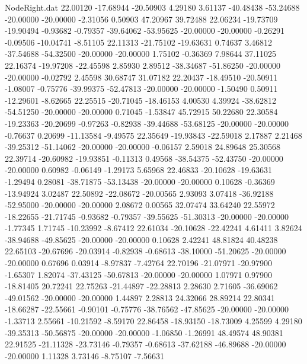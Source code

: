 \begin{filecontents}{NodeRight.dat}
  22.00120  -17.68944  -20.50903     4.29180    3.61137  -40.48438  -53.24688  -20.00000  -20.00000   -2.31056    0.50903   47.20967   39.72488
  22.06234  -19.73709  -19.90494    -0.93682   -0.79357  -39.64062  -53.95625  -20.00000  -20.00000   -0.26291   -0.09506  -10.04741   -8.51105
  22.11313  -21.75102  -19.63631     0.74637    3.46812  -37.54688  -54.32500  -20.00000  -20.00000    1.75102   -0.36369    7.98644   37.11025
  22.16374  -19.97208  -22.45598     2.85930    2.89512  -38.34687  -51.86250  -20.00000  -20.00000   -0.02792    2.45598   30.68747   31.07182
  22.20437  -18.49510  -20.50911    -1.08007   -0.75776  -39.99375  -52.47813  -20.00000  -20.00000   -1.50490    0.50911  -12.29601   -8.62665
  22.25515  -20.71045  -18.46153     4.00530    4.39924  -38.62812  -54.51250  -20.00000  -20.00000    0.71045   -1.53847   45.72915   50.22680
  22.30584  -19.23363  -20.20699    -0.97263   -0.82938  -39.44688  -53.68125  -20.00000  -20.00000   -0.76637    0.20699  -11.13584   -9.49575
  22.35649  -19.93843  -22.59018     2.17887    2.21468  -39.25312  -51.14062  -20.00000  -20.00000   -0.06157    2.59018   24.89648   25.30568
  22.39714  -20.60982  -19.93851    -0.11313    0.49568  -38.54375  -52.43750  -20.00000  -20.00000    0.60982   -0.06149   -1.29173    5.65968
  22.46833  -20.10628  -19.63631    -1.29494    0.28081  -38.71875  -53.13438  -20.00000  -20.00000    0.10628   -0.36369  -13.94924    3.02487
  22.50892  -22.08672  -20.00565     2.93093    3.07418  -36.92188  -52.95000  -20.00000  -20.00000    2.08672    0.00565   32.07474   33.64240
  22.55972  -18.22655  -21.71745    -0.93682   -0.79357  -39.55625  -51.30313  -20.00000  -20.00000   -1.77345    1.71745  -10.23992   -8.67412
  22.61034  -20.10628  -22.42241     4.61411    3.82624  -38.94688  -49.85625  -20.00000  -20.00000    0.10628    2.42241   48.81824   40.48238
  22.65103  -20.67696  -20.03914    -0.82938   -0.68613  -38.10000  -51.20625  -20.00000  -20.00000    0.67696    0.03914   -8.97837   -7.42764
  22.70196  -21.07971  -20.97900    -1.65307    1.82074  -37.43125  -50.67813  -20.00000  -20.00000    1.07971    0.97900  -18.81405   20.72241
  22.75263  -21.44897  -22.28813     2.28630    2.71605  -36.69062  -49.01562  -20.00000  -20.00000    1.44897    2.28813   24.32066   28.89214
  22.80341  -18.66287  -22.55661    -0.90101   -0.75776  -38.76562  -47.85625  -20.00000  -20.00000   -1.33713    2.55661  -10.21592   -8.59170
  22.86458  -18.93150  -18.73009     4.25599    4.29180  -39.35313  -50.56875  -20.00000  -20.00000   -1.06850   -1.26991   48.49574   48.90381
  22.91525  -21.11328  -23.73146    -0.79357   -0.68613  -37.62188  -46.89688  -20.00000  -20.00000    1.11328    3.73146   -8.75107   -7.56631

\end{filecontents}
